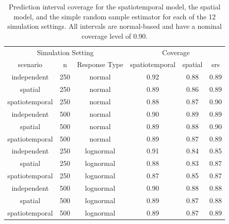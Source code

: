 \documentclass[]{interact}
\theoremstyle{plain}%
\theoremstyle{definition}
\theoremstyle{remark}
\begin{document}
\begin{table}[H]

\caption{\label{tab:simpitab}Prediction interval coverage for the spatiotemporal model, the spatial model, and the simple random sample estimator for each of the 12 simulation settings. All intervals are normal-based and have a nominal coverage level of 0.90.}
\centering
\begin{tabular}[t]{cccccc}
\toprule
\multicolumn{3}{c}{Simulation Setting} & \multicolumn{3}{c}{Coverage} \\
\cmidrule(l{3pt}r{3pt}){1-3} \cmidrule(l{3pt}r{3pt}){4-6}
scenario & n & Response Type & spatiotemporal & spatial & srs\\
\midrule
independent & 250 & normal & 0.92 & 0.88 & 0.89\\
spatial & 250 & normal & 0.89 & 0.86 & 0.89\\
spatiotemporal & 250 & normal & 0.88 & 0.87 & 0.90\\
\midrule
independent & 500 & normal & 0.90 & 0.89 & 0.89\\
spatial & 500 & normal & 0.89 & 0.88 & 0.90\\
spatiotemporal & 500 & normal & 0.89 & 0.87 & 0.89\\
\midrule
independent & 250 & lognormal & 0.91 & 0.84 & 0.85\\
spatial & 250 & lognormal & 0.88 & 0.83 & 0.87\\
spatiotemporal & 250 & lognormal & 0.87 & 0.85 & 0.87\\
\midrule
independent & 500 & lognormal & 0.90 & 0.88 & 0.88\\
spatial & 500 & lognormal & 0.89 & 0.87 & 0.88\\
spatiotemporal & 500 & lognormal & 0.89 & 0.87 & 0.89\\
\bottomrule
\end{tabular}
\end{table}



\end{document}
